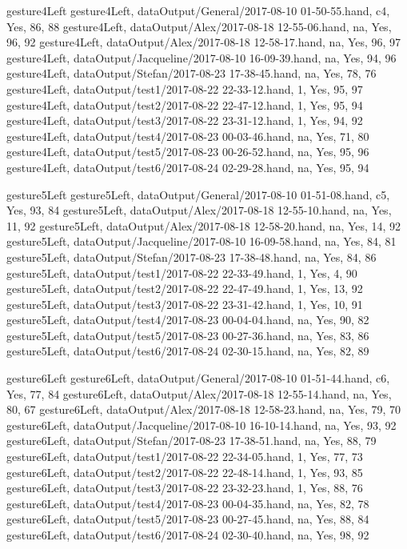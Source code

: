 gesture4Left
gesture4Left, dataOutput/General/2017-08-10 01-50-55.hand, c4, Yes, 86, 88
gesture4Left, dataOutput/Alex/2017-08-18 12-55-06.hand, na, Yes, 96, 92
gesture4Left, dataOutput/Alex/2017-08-18 12-58-17.hand, na, Yes, 96, 97
gesture4Left, dataOutput/Jacqueline/2017-08-10 16-09-39.hand, na, Yes, 94, 96
gesture4Left, dataOutput/Stefan/2017-08-23 17-38-45.hand, na, Yes, 78, 76
gesture4Left, dataOutput/test1/2017-08-22 22-33-12.hand, 1, Yes, 95, 97
gesture4Left, dataOutput/test2/2017-08-22 22-47-12.hand, 1, Yes, 95, 94
gesture4Left, dataOutput/test3/2017-08-22 23-31-12.hand, 1, Yes, 94, 92
gesture4Left, dataOutput/test4/2017-08-23 00-03-46.hand, na, Yes, 71, 80
gesture4Left, dataOutput/test5/2017-08-23 00-26-52.hand, na, Yes, 95, 96
gesture4Left, dataOutput/test6/2017-08-24 02-29-28.hand, na, Yes, 95, 94

gesture5Left
gesture5Left, dataOutput/General/2017-08-10 01-51-08.hand, c5, Yes, 93, 84
gesture5Left, dataOutput/Alex/2017-08-18 12-55-10.hand, na, Yes, 11, 92
gesture5Left, dataOutput/Alex/2017-08-18 12-58-20.hand, na, Yes, 14, 92
gesture5Left, dataOutput/Jacqueline/2017-08-10 16-09-58.hand, na, Yes, 84, 81
gesture5Left, dataOutput/Stefan/2017-08-23 17-38-48.hand, na, Yes, 84, 86
gesture5Left, dataOutput/test1/2017-08-22 22-33-49.hand, 1, Yes, 4, 90
gesture5Left, dataOutput/test2/2017-08-22 22-47-49.hand, 1, Yes, 13, 92
gesture5Left, dataOutput/test3/2017-08-22 23-31-42.hand, 1, Yes, 10, 91
gesture5Left, dataOutput/test4/2017-08-23 00-04-04.hand, na, Yes, 90, 82
gesture5Left, dataOutput/test5/2017-08-23 00-27-36.hand, na, Yes, 83, 86
gesture5Left, dataOutput/test6/2017-08-24 02-30-15.hand, na, Yes, 82, 89

gesture6Left
gesture6Left, dataOutput/General/2017-08-10 01-51-44.hand, c6, Yes, 77, 84
gesture6Left, dataOutput/Alex/2017-08-18 12-55-14.hand, na, Yes, 80, 67
gesture6Left, dataOutput/Alex/2017-08-18 12-58-23.hand, na, Yes, 79, 70
gesture6Left, dataOutput/Jacqueline/2017-08-10 16-10-14.hand, na, Yes, 93, 92
gesture6Left, dataOutput/Stefan/2017-08-23 17-38-51.hand, na, Yes, 88, 79
gesture6Left, dataOutput/test1/2017-08-22 22-34-05.hand, 1, Yes, 77, 73
gesture6Left, dataOutput/test2/2017-08-22 22-48-14.hand, 1, Yes, 93, 85
gesture6Left, dataOutput/test3/2017-08-22 23-32-23.hand, 1, Yes, 88, 76
gesture6Left, dataOutput/test4/2017-08-23 00-04-35.hand, na, Yes, 82, 78
gesture6Left, dataOutput/test5/2017-08-23 00-27-45.hand, na, Yes, 88, 84
gesture6Left, dataOutput/test6/2017-08-24 02-30-40.hand, na, Yes, 98, 92

